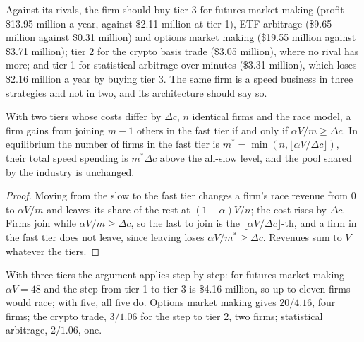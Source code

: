 Against its rivals, the firm should buy tier 3 for futures market making (profit \$13.95 million a year, against \$2.11 million at tier 1), ETF
arbitrage (\$9.65 million against \$0.31 million) and options market making (\$19.55 million against \$3.71 million); tier 2 for the crypto basis
trade (\$3.05 million), where no rival has more; and tier 1 for statistical arbitrage over minutes (\$3.31 million), which loses \$2.16 million a
year by buying tier 3. The same firm is a speed business in three strategies and not in two, and its architecture should say so.

\begin{proposition}\label{prop:fm:technology-strategy:count}
With two tiers whose costs differ by $\Delta c$, $n$ identical firms and the race model, a firm gains from joining $m-1$ others in the fast tier if
and only if $\alpha V/m\ge\Delta c$. In equilibrium the number of firms in the fast tier is $m^*=\min(n,\lfloor\alpha V/\Delta c\rfloor)$, their
total speed spending is $m^*\Delta c$ above the all-slow level, and the pool shared by the industry is unchanged.
\end{proposition}

\begin{proof}
Moving from the slow to the fast tier changes a firm's race revenue from 0 to $\alpha V/m$ and leaves its share of the rest at $(1-\alpha)V/n$;
the cost rises by $\Delta c$. Firms join while $\alpha V/m\ge\Delta c$, so the last to join is the $\lfloor\alpha V/\Delta c\rfloor$-th, and a firm
in the fast tier does not leave, since leaving loses $\alpha V/m^*\ge\Delta c$. Revenues sum to $V$ whatever the tiers.
\end{proof}

With three tiers the argument applies step by step: for futures market making $\alpha V=48$ and the step from tier 1 to tier 3 is \$4.16 million,
so up to eleven firms would race; with five, all five do. Options market making gives $20/4.16$, four firms; the crypto trade, $3/1.06$ for the
step to tier 2, two firms; statistical arbitrage, $2/1.06$, one.

